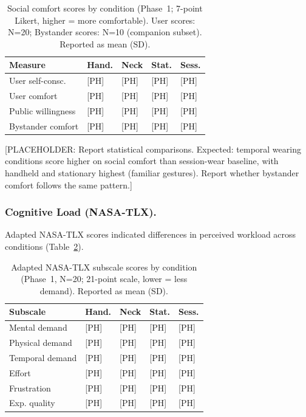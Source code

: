 \begin{table}[t]
\centering
\caption{Social comfort scores by condition (Phase~1; 7-point Likert, higher = more comfortable). User scores: N=20; Bystander scores: N=10 (companion subset). Reported as mean (SD).}
\label{tab:lab-comfort}
\begin{tabular}{p{2.5cm} p{1.3cm} p{1.3cm} p{1.3cm} p{1.3cm}}
\toprule
\textbf{Measure} & \textbf{Hand.} & \textbf{Neck} & \textbf{Stat.} & \textbf{Sess.} \\
\midrule
User self-consc. & [PH] & [PH] & [PH] & [PH] \\
User comfort & [PH] & [PH] & [PH] & [PH] \\
Public willingness & [PH] & [PH] & [PH] & [PH] \\
Bystander comfort & [PH] & [PH] & [PH] & [PH] \\
\bottomrule
\end{tabular}
\end{table}

[PLACEHOLDER: Report statistical comparisons. Expected: temporal wearing conditions score higher on social comfort than session-wear baseline, with handheld and stationary highest (familiar gestures). Report whether bystander comfort follows the same pattern.]

\subsubsection{Cognitive Load (NASA-TLX).}
Adapted NASA-TLX scores indicated differences in perceived workload across conditions (Table~\ref{tab:lab-tlx}).

\begin{table}[t]
\centering
\caption{Adapted NASA-TLX subscale scores by condition (Phase~1, N=20; 21-point scale, lower = less demand). Reported as mean (SD).}
\label{tab:lab-tlx}
\begin{tabular}{p{2.5cm} p{1.3cm} p{1.3cm} p{1.3cm} p{1.3cm}}
\toprule
\textbf{Subscale} & \textbf{Hand.} & \textbf{Neck} & \textbf{Stat.} & \textbf{Sess.} \\
\midrule
Mental demand & [PH] & [PH] & [PH] & [PH] \\
Physical demand & [PH] & [PH] & [PH] & [PH] \\
Temporal demand & [PH] & [PH] & [PH] & [PH] \\
Effort & [PH] & [PH] & [PH] & [PH] \\
Frustration & [PH] & [PH] & [PH] & [PH] \\
Exp. quality & [PH] & [PH] & [PH] & [PH] \\
\bottomrule
\end{tabular}
\end{table}

